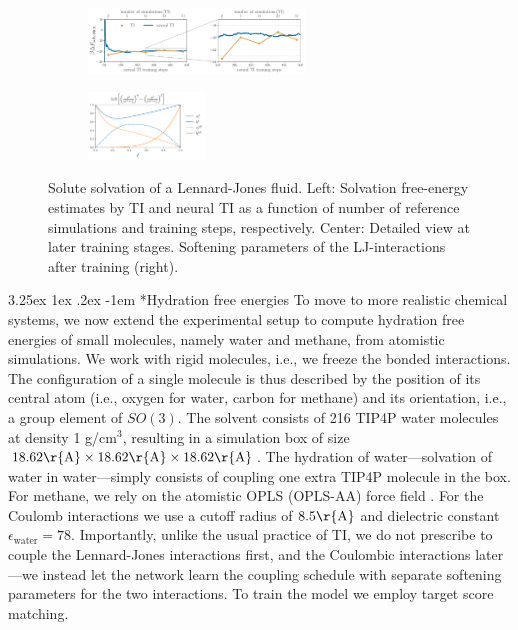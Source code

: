 \documentclass[%
onecolumn,
superscriptaddress,
nofootinbib,
amsmath,amssymb,
table
]{revtex4-2}
\makeatletter
\renewcommand\paragraph{%
  \@startsection{paragraph}{4}{\z@}%
    {3.25ex \@plus1ex \@minus.2ex}%
    {-1em}%
    {\normalfont\normalsize\bfseries}%
}
\makeatother
\begin{document}
\begin{figure}[htb]
     \centering
     \begin{subfigure}
         \centering
         \includegraphics[width=0.63\textwidth]{figures/LJ_solute_free_energy.pdf}
     \end{subfigure}
     \hfill
     \begin{subfigure}
         \centering
         \includegraphics[width=0.34\textwidth]{figures/LJ_softening.pdf}
     \end{subfigure}
     \caption{Solute solvation of a Lennard-Jones fluid. Left: Solvation free-energy estimates by TI and neural TI as a function of number of reference simulations and training steps, respectively. Center: Detailed view at later training stages. Softening parameters of the LJ-interactions after training (right).}
     \label{fig:resultsLJ}
\end{figure}

\paragraph*{Hydration free energies}
\label{sec:experiments_hydr}
To move to more realistic chemical systems, we now extend the experimental setup to compute hydration free energies of small molecules, namely water and methane, from atomistic simulations. We work with rigid molecules, i.e., we freeze the bonded interactions. The configuration of a single molecule is thus described by the position of its central atom (i.e., oxygen for water, carbon for methane) and its orientation, i.e., a group element of $SO(3)$. The solvent consists of 216 TIP4P water molecules \citep{jorgensen1983comparison} at density 1 g/cm$^3$, resulting in a simulation box of size $18.62 \mathrm{\r{A}} \times 18.62 \mathrm{\r{A}} \times 18.62 \mathrm{\r{A}}$. The hydration of water---solvation of water in water---simply consists of coupling one extra TIP4P molecule in the box. For methane, we rely on the atomistic OPLS (OPLS-AA) force field \citep{mackerell1998all}. 
For the Coulomb interactions we use a cutoff radius  of $8.5 \mathrm{\r{A}}$ and dielectric constant $\epsilon_\text{water}=78$. Importantly, unlike the usual practice of TI, we do not prescribe to couple the Lennard-Jones interactions first, and the Coulombic interactions later---we instead let the network learn the coupling schedule with separate softening parameters for the two interactions. To train the model we employ target score matching.
\end{document}
